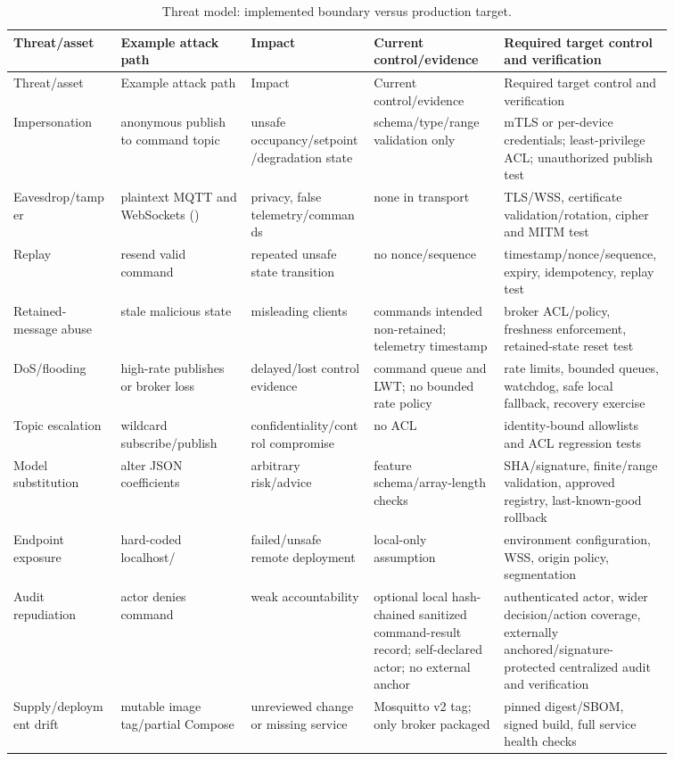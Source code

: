 \begin{landscape}
\begin{longtable}{L{0.14\linewidth}L{0.17\linewidth}L{0.16\linewidth}L{0.17\linewidth}L{0.22\linewidth}}
\caption{Threat model: implemented boundary versus production target.}\label{tab:threats}\\
\toprule
Threat/asset & Example attack path & Impact & Current control/evidence & Required target control and verification\\
\midrule
\endfirsthead
\toprule Threat/asset & Example attack path & Impact & Current control/evidence & Required target control and verification\\
\midrule\endhead
Impersonation & anonymous publish to command topic & unsafe occupancy/setpoint/degradation state & schema/type/range validation only & mTLS or per-device credentials; least-privilege ACL; unauthorized publish test\\
Eavesdrop/tamper & plaintext MQTT and WebSockets () & privacy, false telemetry/commands & none in transport & TLS/WSS, certificate validation/rotation, cipher and MITM test\\
Replay & resend valid command & repeated unsafe state transition & no nonce/sequence & timestamp/nonce/sequence, expiry, idempotency, replay test\\
Retained-message abuse & stale malicious state & misleading clients & commands intended non-retained; telemetry timestamp & broker ACL/policy, freshness enforcement, retained-state reset test\\
DoS/flooding & high-rate publishes or broker loss & delayed/lost control evidence & command queue and LWT; no bounded rate policy & rate limits, bounded queues, watchdog, safe local fallback, recovery exercise\\
Topic escalation & wildcard subscribe/publish & confidentiality/control compromise & no ACL & identity-bound allowlists and ACL regression tests\\
Model substitution & alter JSON coefficients & arbitrary risk/advice & feature schema/array-length checks & SHA/signature, finite/range validation, approved registry, last-known-good rollback\\
Endpoint exposure & hard-coded localhost/ & failed/unsafe remote deployment & local-only assumption & environment configuration, WSS, origin policy, segmentation\\
Audit repudiation & actor denies command & weak accountability & optional local hash-chained sanitized command-result record; self-declared actor; no external anchor & authenticated actor, wider decision/action coverage, externally anchored/signature-protected centralized audit and verification\\
Supply/deployment drift & mutable image tag/partial Compose & unreviewed change or missing service & Mosquitto v2 tag; only broker packaged & pinned digest/SBOM, signed build, full service health checks\\
\bottomrule
\end{longtable}
\end{landscape}
